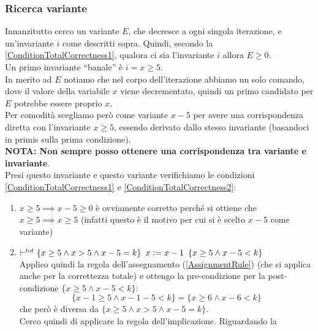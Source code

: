 \begin{esempio}
				      		\subsubsection{Ricerca variante}
				      					Innanzitutto cerco un variante $E$, che decresce a ogni singola iterazione, e
				      					un'invariante $i$ come descritti sopra. Quindi, secondo la \ref{ConditionTotalCorrectness1}, qualora ci sia
				      					l'invariante $i$ allora  $E\geq 0$.\\
				      					Un primo invariante ``banale'' è $i=x\geq 5$.\\
				      					In merito ad $E$ notiamo che nel corpo dell'iterazione abbiamo un solo
				      					comando, dove il valore della variabile $x$ viene decrementato, quindi un
				      					primo candidato per $E$ potrebbe essere proprio $x$.\\
				      					Per comodità scegliamo però come variante $x-5$ per avere una
				      					corrispondenza diretta con l'invariante $x\geq 5$, essendo derivato dallo
				      					stesso invariante (basandoci in primis sulla prima condizione).\\
				      					\textbf{NOTA: Non sempre posso ottenere una corrispondenza tra variante e
				      						invariante}.\\
				      					Presi questo invariante e questo variante verifichiamo le condizioni \ref{ConditionTotalCorrectness1} e \ref{ConditionTotalCorrectness2}:
				      					\begin{enumerate}
				      						\item $x\geq 5\implies x-5\geq 0$ è ovviamente corretto perché si ottiene
				      						      che $x\geq 5\implies x \geq 5$ (infatti questo è il motivo per cui si è
				      						      scelto $x-5$ come variante)
				      						\item $\vdash^{tot}\{x\geq 5\land x>5\land x-5=k\}\,\,\,x\cceq
				      						      x-1\,\,\,\{x\geq 5\land x-5<k\}$\\
				      						      Applico quindi la regola dell'assegnamento (\ref{AssignmentRule}) (che si applica anche per la
				      						      correttezza totale) e ottengo la pre-condizione per la post-condizione
				      						      $\{x\geq 5\land x-5<k\}$:
				      						      \[\{x-1\geq 5\land x-1-5<k\}=\{x\geq 6\land x-6 < k\}\]
				      						      che però è diversa da $\{x\geq 5\land x>5\land x-5=k\}$.\\
				      						      Cerco quindi di applicare la regola dell'implicazione. Riguardando la

\end{enumerate}
\end{esempio}
